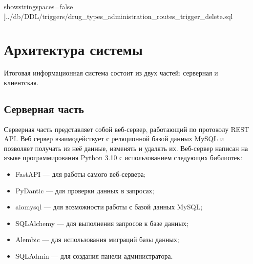 \documentclass[a4paper]{article}
\newcommand{\dbtableref}[1]{\textit{#1}}
\begin{document}
				showstringspaces=false
			]{../db/DDL/triggers/drug_types_administration_routes_trigger_delete.sql}
			
			
			
	
	\newpage
	
	\section{Архитектура системы}
		Итоговая информационная система состоит из двух частей: серверная и клиентская.

		\subsection{Серверная часть}
			Серверная часть представляет собой веб-сервер, работающий по протоколу REST API. Веб сервер взаимодействует с реляционной базой данных MySQL и позволяет получать из неё данные, изменять и удалять их. Веб-сервер написан на языке программирования Python 3.10 с использованием следующих библиотек:
			\begin{itemize}
				\item FastAPI --- для работы самого веб-сервера;
				
				\item PyDantic --- для проверки данных в запросах;
								
				\item aiomysql --- для возможности работы с базой данных MySQL;
								
				\item SQLAlchemy --- для выполнения запросов к базе данных;
											
				\item Alembic --- для использования миграций базы данных;
				
				\item SQLAdmin --- для создания панели администратора.
			\end{itemize}
\end{document}
